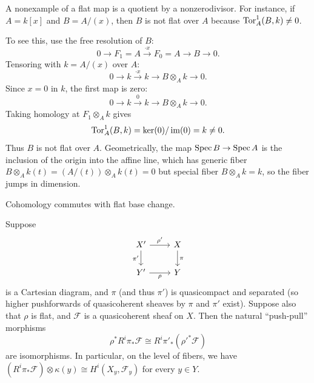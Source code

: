 \documentclass[12pt]{article}
\begin{document}
\begin{example}
    A nonexample of a flat map is a quotient by a nonzerodivisor. For instance, if $A = k[x]$ and $B = A/(x)$, then $B$ is not flat over $A$ because $\operatorname{Tor}^1_A(B, k) \neq 0$.

    To see this, use the free resolution of $B$:
    \[
        0 \to F_1 = A \xrightarrow{\cdot x} F_0 = A \to B \to 0.
    \]
    Tensoring with $k = A/(x)$ over $A$:
    \[
        0 \to k \xrightarrow{\cdot x} k \to B \otimes_A k \to 0.
    \]
    Since $x = 0$ in $k$, the first map is zero:
    \[
        0 \to k \xrightarrow{0} k \to B \otimes_A k \to 0.
    \]
    Taking homology at $F_1 \otimes_A k$ gives
    \[
        \operatorname{Tor}^1_A(B,k) = \ker(0) / \operatorname{im}(0) = k \neq 0.
    \]
    Thus $B$ is not flat over $A$. Geometrically, the map $\operatorname{Spec} B \to \operatorname{Spec} A$ is the inclusion of the origin into the affine line, which has generic fiber $B \otimes_A k(t) = (A/(t)) \otimes_A k(t) = 0$ but special fiber $B \otimes_A k = k$, so the fiber jumps in dimension.
\end{example}


Cohomology commutes with flat base change.
\begin{theorem}
    Suppose
    \[
        \begin{tikzcd}
            X' \arrow[r, "\rho'"] \arrow[d, "\pi'"'] & X \arrow[d, "\pi"] \\
            Y' \arrow[r, "\rho"'] & Y
        \end{tikzcd}
    \]
    is a Cartesian diagram, and $\pi$ (and thus $\pi'$) is quasicompact and separated (so higher pushforwards of quasicoherent sheaves by $\pi$ and $\pi'$ exist). Suppose also that $\rho$ is flat, and $\mathcal{F}$ is a quasicoherent sheaf on $X$. Then the natural ``push-pull'' morphisms
    \[
        \rho^* R^i\pi_* \mathcal F \cong R^i \pi'_* (\rho'^*\mathcal F)
    \]
    are isomorphisms. In particular, on the level of fibers, we have $(R^i\pi_*\mathcal F)\otimes \kappa(y)
        \cong H^i(X_y,\mathcal F_y)$ for every $y\in Y$.
\end{theorem}
\end{document}
